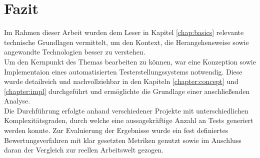 \chapter{Fazit}
Im Rahmen dieser Arbeit wurden dem Leser in Kapitel \ref{chap:basics} relevante technische Grundlagen vermittelt, um den Kontext, die Herangehensweise sowie angewandte Technologien besser zu verstehen.\\ Um den Kernpunkt des Themas bearbeiten zu können, war eine Konzeption sowie Implementaion eines automatisierten Testerstellungssystems notwendig. Diese wurde detailreich und nachvollziehbar in den Kapiteln \ref{chapter:concept} und \ref{chapter:impl} durchgeführt und ermöglichte die Grundlage einer anschließenden Analyse.\\ Die Durchführung erfolgte anhand verschiedener Projekte mit unterschiedlichen Komplexitätsgraden, durch welche eine aussagekräftige Anzahl an Tests generiert werden konnte. Zur Evaluierung der Ergebnisse wurde ein fest definiertes Bewertungsverfahren mit klar gesetzten Metriken genutzt sowie im Anschluss daran der Vergleich zur reellen Arbeitswelt gezogen.

